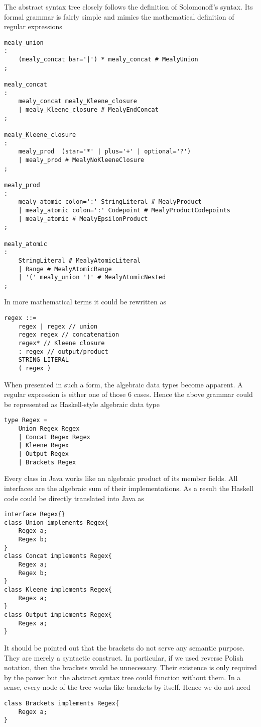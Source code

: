 The abstract syntax tree closely follows the definition of Solomonoff's syntax. Its formal grammar is fairly simple and mimics the mathematical definition of regular expressions
\begin{lstlisting}
mealy_union
:
    (mealy_concat bar='|') * mealy_concat # MealyUnion
;

mealy_concat
:
    mealy_concat mealy_Kleene_closure
    | mealy_Kleene_closure # MealyEndConcat
;

mealy_Kleene_closure
:
    mealy_prod  (star='*' | plus='+' | optional='?') 
    | mealy_prod # MealyNoKleeneClosure
;

mealy_prod
:
    mealy_atomic colon=':' StringLiteral # MealyProduct
    | mealy_atomic colon=':' Codepoint # MealyProductCodepoints
    | mealy_atomic # MealyEpsilonProduct
;

mealy_atomic
:
    StringLiteral # MealyAtomicLiteral
    | Range # MealyAtomicRange
    | '(' mealy_union ')' # MealyAtomicNested
;
\end{lstlisting}
In more mathematical terms it could be rewritten as
\begin{lstlisting}
regex ::= 
    regex | regex // union
    regex regex // concatenation
    regex* // Kleene closure
    : regex // output/product
    STRING_LITERAL 
    ( regex ) 
\end{lstlisting}
When presented in such a form, the algebraic data types become apparent.
A regular expression is either one of those 6 cases. Hence the above grammar could be represented as Haskell-style algebraic data type
\begin{lstlisting}
type Regex = 
    Union Regex Regex 
    | Concat Regex Regex
    | Kleene Regex
    | Output Regex
    | Brackets Regex
\end{lstlisting}
Every class in Java works like an algebraic product of its member fields. All interfaces are the algebraic sum of their implementations. As a result the Haskell code could be directly translated into Java as
\begin{lstlisting}
interface Regex{}
class Union implements Regex{
    Regex a; 
    Regex b;
}
class Concat implements Regex{
    Regex a;
    Regex b;
}
class Kleene implements Regex{
    Regex a;
}
class Output implements Regex{
    Regex a;
}
\end{lstlisting}
It should be pointed out that the brackets do not serve any semantic purpose. They are merely a syntactic construct. In particular, if we used reverse Polish notation, then the brackets would be unnecessary. Their existence is only required by the parser but the abstract syntax tree could function without them. In a sense, every node of the tree works like brackets by itself. Hence we do not need
\begin{lstlisting}
class Brackets implements Regex{
    Regex a;
}
\end{lstlisting}
